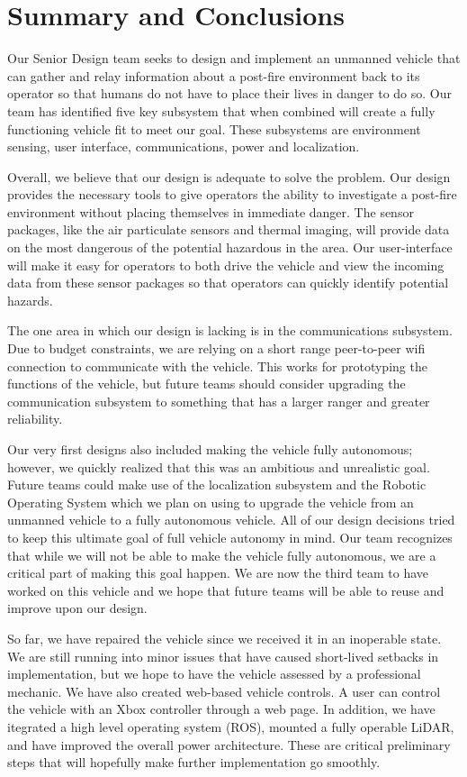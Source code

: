 \chapter{Summary and Conclusions}

Our Senior Design team seeks to design and implement an unmanned vehicle that can gather and relay information about a post-fire environment back to its operator so that humans do not have to place their lives in danger to do so. Our team has identified five key subsystem that when combined will create a fully functioning vehicle fit to meet our goal.  These subsystems are environment sensing, user interface, communications, power and localization.

Overall, we believe that our design is adequate to solve the problem.  Our design provides the necessary tools to give operators the ability to investigate a post-fire environment without placing themselves in immediate danger.  The sensor packages, like the air particulate sensors and thermal imaging, will provide data on the most dangerous of the potential hazardous in the area.  Our user-interface will make it easy for operators to both drive the vehicle and view the incoming data from these sensor packages so that operators can quickly identify potential hazards.

The one area in which our design is lacking is in the communications subsystem.  Due to budget constraints, we are relying on a short range peer-to-peer wifi connection to communicate with the vehicle.  This works for prototyping the functions of the vehicle, but future teams should consider upgrading the communication subsystem to something that has a larger ranger and greater reliability.  

Our very first designs also included making the vehicle fully autonomous; however, we quickly realized that this was an ambitious and unrealistic goal.  Future teams could make use of the localization subsystem and the Robotic Operating System which we plan on using to upgrade the vehicle from an unmanned vehicle to a fully autonomous vehicle.  All of our design decisions tried to keep this ultimate goal of full vehicle autonomy in mind.  Our team recognizes that while we will not be able to make the vehicle fully autonomous, we are a critical part of making this goal happen. We are now the third team to have worked on this vehicle and we hope that future teams will be able to reuse and improve upon our design.

So far, we have repaired the vehicle since we received it in an inoperable state. We are still running into minor issues that have caused short-lived setbacks in implementation, but we hope to have the vehicle assessed by a professional mechanic. We have also created web-based vehicle controls. A user can control the vehicle with an Xbox controller through a web page. In addition, we have itegrated a high level operating system (ROS), mounted a fully operable LiDAR, and have improved the overall power architecture. These are critical preliminary steps that will hopefully make further implementation go smoothly. 